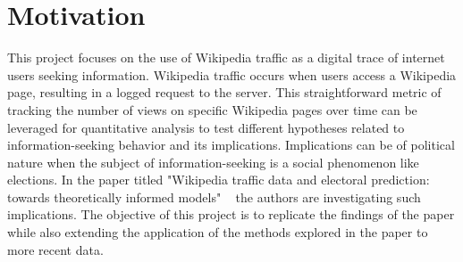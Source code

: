 \chapter{Motivation}
\label{sec:motivation}

This project focuses on the use of Wikipedia traffic as a digital trace of internet users seeking information. Wikipedia traffic occurs when users access a Wikipedia page, resulting in a logged request to the server. This straightforward metric of tracking the number of views on specific Wikipedia pages over time can be leveraged for quantitative analysis to test different hypotheses related to information-seeking behavior and its implications. Implications can be of political nature when the subject of information-seeking is a social phenomenon like elections. In the paper titled "Wikipedia traffic data and electoral prediction: towards theoretically informed models" ~\cite{Yasseri2016Dec} the authors are investigating such implications. The objective of this project is to replicate the findings of the paper while also extending the application of the methods explored in the paper to more recent data. \par 

